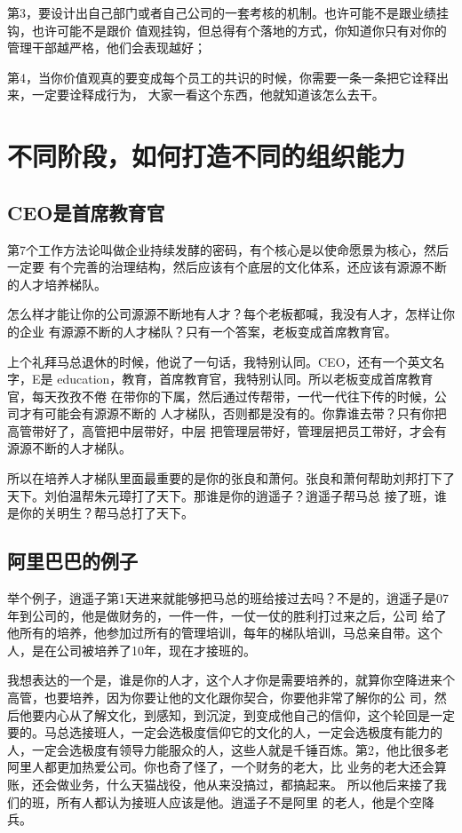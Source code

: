 \documentclass[12pt]{article}
\begin{document}
第3，要设计出自己部门或者自己公司的一套考核的机制。也许可能不是跟业绩挂钩，也许可能不是跟价 值观挂钩，但总得有个落地的方式，你知道你只有对你的管理干部越严格，他们会表现越好；

第4，当你价值观真的要变成每个员工的共识的时候，你需要一条一条把它诠释出来，一定要诠释成行为， 大家一看这个东西，他就知道该怎么去干。

\section{不同阶段，如何打造不同的组织能力}
\subsection{CEO是首席教育官}
第7个工作方法论叫做企业持续发酵的密码，有个核心是以使命愿景为核心，然后一定要 有个完善的治理结构，然后应该有个底层的文化体系，还应该有源源不断的人才培养梯队。

怎么样才能让你的公司源源不断地有人才？每个老板都喊，我没有人才，怎样让你的企业 有源源不断的人才梯队？只有一个答案，老板变成首席教育官。

上个礼拜马总退休的时候，他说了一句话，我特别认同。CEO，还有一个英文名字，E是 education，教育，首席教育官，我特别认同。所以老板变成首席教育官，每天孜孜不倦 在带你的下属，然后通过传帮带，一代一代往下传的时候，公司才有可能会有源源不断的 人才梯队，否则都是没有的。你靠谁去带？只有你把高管带好了，高管把中层带好，中层 把管理层带好，管理层把员工带好，才会有源源不断的人才梯队。

所以在培养人才梯队里面最重要的是你的张良和萧何。张良和萧何帮助刘邦打下了天下。刘伯温帮朱元璋打了天下。那谁是你的逍遥子？逍遥子帮马总 接了班，谁是你的关明生？帮马总打了天下。

\subsection{阿里巴巴的例子}
举个例子，逍遥子第1天进来就能够把马总的班给接过去吗？不是的，逍遥子是07年到公司的，他是做财务的，一件一件，一仗一仗的胜利打过来之后，公司 给了他所有的培养，他参加过所有的管理培训，每年的梯队培训，马总亲自带。这个人，是在公司被培养了10年，现在才接班的。

我想表达的一个是，谁是你的人才，这个人才你是需要培养的，就算你空降进来个高管，也要培养，因为你要让他的文化跟你契合，你要他非常了解你的公 司，然后他要内心从了解文化，到感知，到沉淀，到变成他自己的信仰，这个轮回是一定要的。马总选接班人，一定会选极度信仰它的文化的人，一定会选极度有能力的人，一定会选极度有领导力能服众的人，这些人就是千锤百炼。第2，他比很多老阿里人都更加热爱公司。你也奇了怪了，一个财务的老大，比 业务的老大还会算账，还会做业务，什么天猫战役，他从来没搞过，都搞起来。 所以他后来接了我们的班，所有人都认为接班人应该是他。逍遥子不是阿里 的老人，他是个空降兵。
\end{document}
